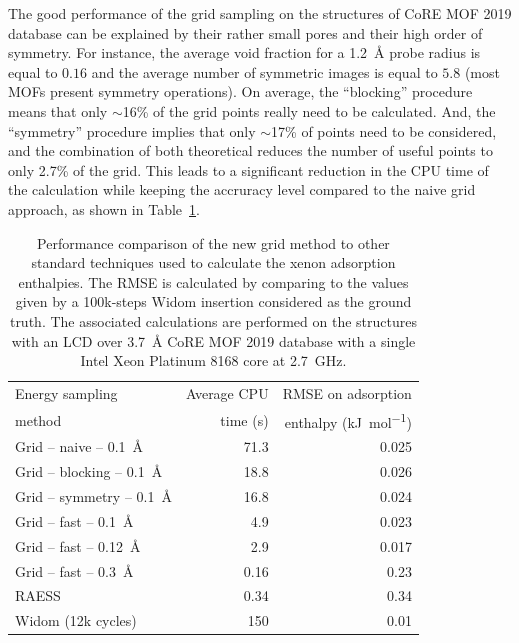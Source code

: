 \documentclass[main]{subfiles}
\begin{document}
The good performance of the grid sampling on the structures of CoRE MOF 2019 database can be explained by their rather small pores and their high order of symmetry. For instance, the average void fraction for a \SI{1.2}{\angstrom} probe radius is equal to $0.16$ and the average number of symmetric images is equal to $5.8$ (most MOFs present symmetry operations). On average, the ``blocking'' procedure means that only {$\sim$16\%} of the grid points really need to be calculated. And, the ``symmetry'' procedure implies that only {$\sim$17\%} of points need to be considered, and the combination of both theoretical reduces the number of useful points to only {2.7\%} of the grid. This leads to a significant reduction in the CPU time of the calculation while keeping the accruracy level compared to the naive grid approach, as shown in Table~\ref{tab:grid}.

\setlength{\extrarowheight}{0.1cm}
\begin{table}[ht]
  \centering
  \begin{tabular}{|l|r|r|}
    \hline
    Energy sampling  &  Average CPU & RMSE on adsorption  \\
    method &  time (s)  &  enthalpy (\si{\kilo\joule\per\mole}) \\[0.5mm]
    \hline
    Grid -- naive -- \SI{0.1}{\angstrom} &  71.3 & 0.025  \\[0.5mm]
    Grid -- blocking -- \SI{0.1}{\angstrom} &  18.8 & 0.026  \\
    Grid -- symmetry -- \SI{0.1}{\angstrom} &  16.8 & 0.024  \\
    Grid -- fast -- \SI{0.1}{\angstrom} &  4.9 & 0.023  \\
    Grid -- fast -- \SI{0.12}{\angstrom} &  2.9 & 0.017  \\
    Grid -- fast -- \SI{0.3}{\angstrom} &  0.16 & 0.23  \\
    RAESS\cite{Ren_2023}  &  0.34 & 0.34  \\
    Widom\cite{Widom1963} (12k cycles) &  150 & 0.01  \\
    \hline
  \end{tabular}
  \caption{Performance comparison of the new grid method to other standard techniques used to calculate the xenon adsorption enthalpies. The RMSE is calculated by comparing to the values given by a 100k-steps Widom insertion considered as the ground truth. The associated calculations are performed on the structures with an LCD over \SI{3.7}{\angstrom} CoRE MOF 2019 database with a single Intel Xeon Platinum 8168 core at 2.7~GHz. }\label{tab:grid}
\end{table}
\end{document}

